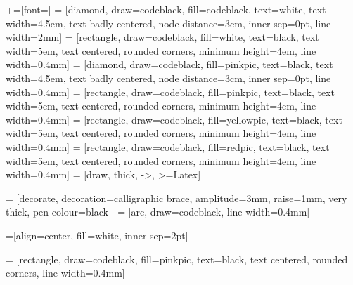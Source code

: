 +=[font=\footnotesize\sffamily]
\usetikzlibrary{calc, shapes, arrows.meta, decorations.pathreplacing, calligraphy,
                positioning}
 = [diamond, draw=codeblack, fill=codeblack, text=white,
    text width=4.5em, text badly centered, node distance=3cm, inner sep=0pt,
    line width=2mm]
 = [rectangle, draw=codeblack, fill=white,  text=black,
    text width=5em, text centered, rounded corners, minimum height=4em,
    line width=0.4mm]
 = [diamond, draw=codeblack, fill=pinkpic, text=black,
    text width=4.5em, text badly centered, node distance=3cm, inner sep=0pt,
    line width=0.4mm]
 = [rectangle, draw=codeblack, fill=pinkpic,  text=black,
    text width=5em, text centered, rounded corners, minimum height=4em,
    line width=0.4mm]
 = [rectangle, draw=codeblack, fill=yellowpic,  text=black,
    text width=5em, text centered, rounded corners, minimum height=4em,
    line width=0.4mm]
 = [rectangle, draw=codeblack, fill=redpic,  text=black,
    text width=5em, text centered, rounded corners, minimum height=4em,
    line width=0.4mm]
 = [draw, thick, ->, >={Latex}]

 =  [decorate,  %
                 decoration={calligraphic brace, amplitude=3mm, raise=1mm},
                 very thick, pen colour={black} ]
 = [arc, draw=codeblack, line width=0.4mm]

=[align=center, fill=white, inner sep=2pt]

 = [rectangle, draw=codeblack, fill=pinkpic,  text=black,
    text centered, rounded corners, line width=0.4mm]
\pgfplotsset{compat=1.18}
\pgfplotsset{width=\textwidth}
